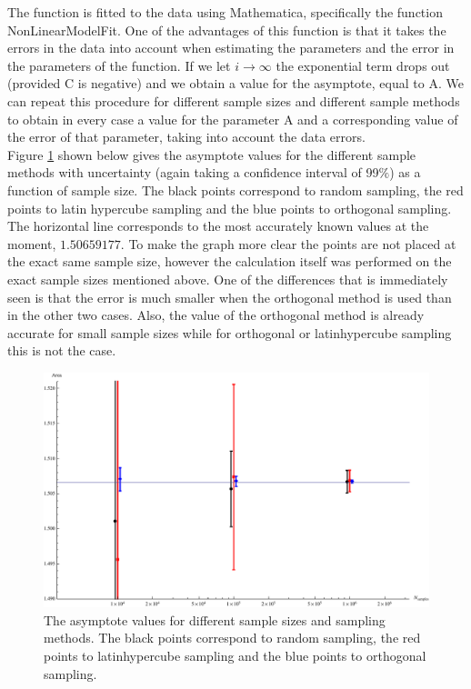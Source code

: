 \documentclass[10pt,a4paper]{article}
\begin{document}
\noindent The function is fitted to the data using Mathematica, specifically the function NonLinearModelFit. One of the advantages of this function is that it takes the errors in the data into account when estimating the parameters and the error in the parameters of the function. If we let $i \rightarrow \infty$ the exponential term drops out (provided C is negative) and we obtain a value for the asymptote, equal to A. We can repeat this procedure for different sample sizes and different sample methods to obtain in every case a value for the parameter A and a corresponding value of the error of that parameter, taking into account the data errors.\\
\noindent Figure \ref{fig:asymptote_values} shown below gives the asymptote values for the different sample methods with uncertainty (again taking a confidence interval of 99$\%$) as a function of sample size. The black points correspond to random sampling, the red points to latin hypercube sampling and the blue points to orthogonal sampling. The horizontal line corresponds to the most accurately known values at the moment, $1.506 591 77$. To make the graph more clear the points are not placed at the exact same sample size, however the calculation itself was performed on the exact sample sizes mentioned above. One of the differences that is immediately seen is that the error is much smaller when the orthogonal method is used than in the other two cases. Also, the value of the orthogonal method is already accurate for small sample sizes while for orthogonal or latinhypercube sampling this is not the case.

\begin{figure}[H]
  \centering
  \includegraphics[scale=0.8]{asymptote_values.pdf}
  \caption{The asymptote values for different sample sizes and sampling methods. The black points correspond to random sampling, the red points to latinhypercube sampling and the blue points to orthogonal sampling.}
  \label{fig:asymptote_values}
\end{figure}
\end{document}
